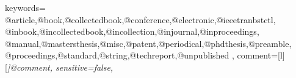 \pagestyle{fancy}
\usepackage{fontyscoverpage}
\usepackage{eso-pic} %
\newcommand\watermarktext{Draft}
\makeatletter
  \AddToShipoutPicture{%
    \setlength{\@tempdimb}{.5\paperwidth}%
    \setlength{\@tempdimc}{.5\paperheight}%
    \setlength{\unitlength}{1pt}%
    \put(\strip@pt\@tempdimb,\strip@pt\@tempdimc){%
      \makebox(0,0){\rotatebox{55}{%
          \textcolor[gray]{0.85}{%
            \fontsize{8cm}{8cm}%
            \sffamily
            \selectfont{\watermarktext}}}}
    }
}
\makeatother
{}
  {keywords={%
      @article,@book,@collectedbook,@conference,@electronic,@ieeetranbstctl,%
      @inbook,@incollectedbook,@incollection,@injournal,@inproceedings,%
      @manual,@mastersthesis,@misc,@patent,@periodical,@phdthesis,@preamble,%
      @proceedings,@standard,@string,@techreport,@unpublished%
      },
   comment=[l][\itshape]{@comment},
   sensitive=false,
  }

